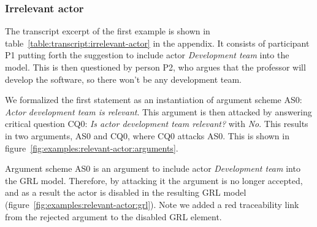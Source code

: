 \subsubsection{Irrelevant actor}

The transcript excerpt of the first example is shown in table~\ref{table:transcript:irrelevant-actor} in the appendix. It consists of participant P1 putting forth the suggestion to include actor \emph{Development team} into the model. This is then questioned by person P2, who argues that the professor will develop the software, so there won't be any development team. 

We formalized the first statement as an instantiation of argument scheme AS0: \emph{Actor development team is relevant}. This argument is then attacked by answering critical question CQ0: \emph{Is actor development team relevant?} with \emph{No}. This results in two arguments, AS0 and CQ0, where CQ0 attacks AS0. This is shown in figure~\ref{fig:examples:relevant-actor:arguments}.

Argument scheme AS0 is an argument to include actor \emph{Development team} into the GRL model. Therefore, by attacking it the argument is no longer accepted, and as a result the actor is disabled in the resulting GRL model (figure~\ref{fig:examples:relevant-actor:grl}). Note we added a red traceability link from the rejected argument to the disabled GRL element.

